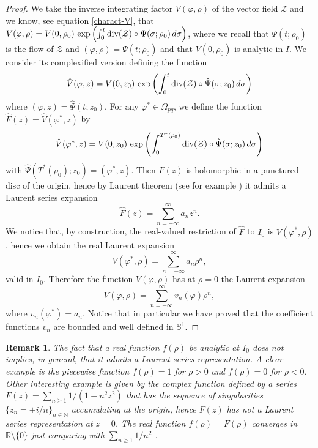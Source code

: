 \documentclass[12pt]{amsart}
\newtheorem {remark} [theorem]{\sc Remark}
\begin{document}
\begin{proof}
We take the inverse integrating factor $V(\varphi, \rho)$ of the vector field $\mathcal{Z}$ and we know, see equation \eqref{charact-V}, that
$V(\varphi, \rho) = V(0, \rho_0) \, \exp\left( \int_0^t {\rm div}(\mathcal{Z}) \circ \Psi(\sigma; \rho_0) \, d\sigma \right)$, where we recall that $\Psi(t; \rho_0)$ is the flow of $\mathcal{Z}$ and $(\varphi, \rho) = \Psi(t; \rho_0)$ and that $V(0, \rho_0)$ is analytic in $I$. We consider its complexified version defining the function
$$
\hat{V}(\varphi, z) = V(0, z_0) \, \exp\left( \int_0^t {\rm div}(\mathcal{Z}) \circ \hat\Psi(\sigma; z_0) \, d\sigma \right)
$$
where $(\varphi, z) = \hat\Psi(t; z_0)$. For any $\varphi^* \in \Omega_{pq}$, we define the function $\hat{F}(z) = \hat{V}(\varphi^*, z)$ by
$$
\hat{V}(\varphi^*, z) = V(0, z_0) \, \exp\left( \int_0^{T^*(\rho_0)} {\rm div}(\mathcal{Z}) \circ \hat\Psi(\sigma; z_0) \, d\sigma \right)
$$
with $\hat\Psi(T^*(\rho_0); z_0) = (\varphi^*, z)$. Then $\hat{F}(z)$ is holomorphic in a  punctured disc of the origin, hence by Laurent theorem (see for example \cite{DyEd}) it admits a Laurent series expansion
$$
\hat{F}(z) = \sum_{n=-\infty}^{\infty} a_n z^n.
$$
We notice that, by construction, the real-valued restriction of $\hat{F}$ to $I_0$ is $V(\varphi^*, \rho)$, hence we obtain the real Laurent expansion
$$
V(\varphi^*, \rho) = \sum_{n=-\infty}^{\infty} a_n \rho^n,
$$
valid in $I_0$. Therefore the function $V(\varphi, \rho)$ has at $\rho=0$ the Laurent expansion
\begin{equation}\label{serie-laurent}
V(\varphi, \rho) = \sum_{n=-\infty}^{\infty} v_n(\varphi) \rho^n,
\end{equation}
where $v_n(\varphi^*) = a_n$. Notice that in particular we have proved that the coefficient functions $v_n$ are bounded and well defined in $\mathbb{S}^1$.
\end{proof}

\begin{remark}
{\rm The fact that a real function $f(\rho)$ be analytic at $I_0$ does not implies, in general, that it admits a Laurent series representation. A clear example is the piecewise function $f(\rho) = 1$ for $\rho > 0$ and $f(\rho) = 0$ for $\rho < 0$. Other interesting example is given by the complex function defined by a series $F(z) = \sum_{n \geq 1} 1/(1 + n^2 z^2)$ that has the sequence of singularities $\{ z_n = \pm i/n \}_{n \in \mathbb{N}}$ accumulating at the origin, hence $F(z)$ has not a Laurent series representation at $z=0$. The real function $f(\rho) = F(\rho)$ converges in $\mathbb{R} \setminus \{0\}$ just comparing with $\sum_{n \geq 1} 1/n^2$ . }
\end{remark}
\end{document}
